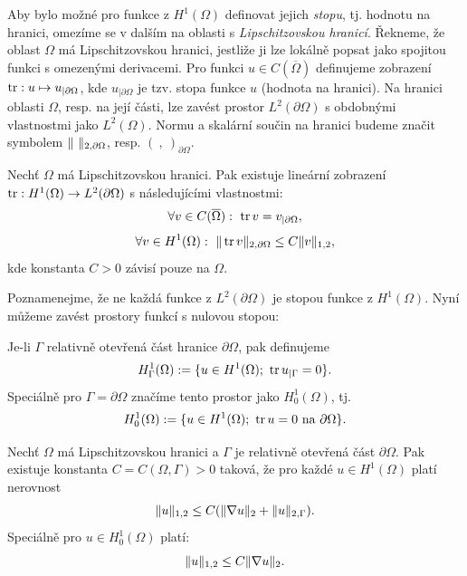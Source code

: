 Aby bylo možné pro funkce z $H^1(\Omega)$ definovat jejich \emph{stopu}, tj. hodnotu na hranici, omezíme se v dalším na oblasti s \emph{Lipschitzovskou hranicí}.
Řekneme, že oblast $\Omega$ má Lipschitzovskou hranici, jestliže ji lze lokálně popsat jako spojitou funkci s omezenými derivacemi.
Pro funkci $u\in C(\overline\Omega)$ definujeme zobrazení $\operatorname{tr}:u\mapsto u_{|\partial\Omega}$, kde $u_{|\partial\Omega}$ je tzv. stopa funkce $u$ (hodnota na hranici).
Na hranici oblasti $\Omega$, resp. na její části, lze zavést prostor $L^2(\partial\Omega)$ s obdobnými vlastnostmi jako $L^2(\Omega)$.
Normu a skalární součin na hranici budeme značit symbolem $\|\ \|_{2,\partial\Omega}$, resp. $(\ ,\ )_{\partial\Omega}$.


\begin{veta}[o stopách]\label{th:trace}
Nechť $\Omega$ má Lipschitzovskou hranici. Pak existuje lineární zobrazení $\operatorname{tr}:H^1(\Omega)\rightarrow L^2(\partial\Omega)$ s následujícími vlastnostmi:
\[ \forall v\in C(\overline\Omega):~ \operatorname{tr} v = v_{|\partial\Omega}, \]
\[ \forall v\in H^1(\Omega):~\|\operatorname{tr} v\|_{2,\partial\Omega} \le C\|v\|_{1,2}, \]
kde konstanta $C>0$ závisí pouze na $\Omega$.
\end{veta}

Poznamenejme, že ne každá funkce z $L^2(\partial\Omega)$ je stopou funkce z $H^1(\Omega)$.
Nyní můžeme zavést prostory funkcí s nulovou stopou:
\begin{df}
Je-li $\Gamma$ relativně otevřená část hranice $\partial\Omega$, pak definujeme
\[ H^1_\Gamma(\Omega) := \{ u\in H^1(\Omega);~\operatorname{tr} u_{|\Gamma}=0 \}. \]
Speciálně pro $\Gamma=\partial\Omega$ značíme tento prostor jako $H^1_0(\Omega)$, tj.
\[ H^1_0(\Omega) := \{ u\in H^1(\Omega);~\operatorname{tr} u=0 \mbox{ na }\partial\Omega\}. \]
\end{df}


\begin{veta}\label{th:friedrichs}
Nechť $\Omega$ má Lipschitzovskou hranici a $\Gamma$ je relativně otevřená část $\partial\Omega$.
Pak existuje konstanta $C=C(\Omega,\Gamma)>0$ taková, že pro každé $u\in H^1(\Omega)$ platí nerovnost
\begin{equation} \label{eq:friedrichs_H1gamma}
\|u\|_{1,2} \le C(\|\nabla u\|_2 + \|u\|_{2,\Gamma}).
\end{equation}
Speciálně pro $u\in H^1_0(\Omega)$ platí:
\begin{equation} \label{eq:friedrichs_H10}
\|u\|_{1,2} \le C\|\nabla u\|_2.
\end{equation}
\end{veta}


